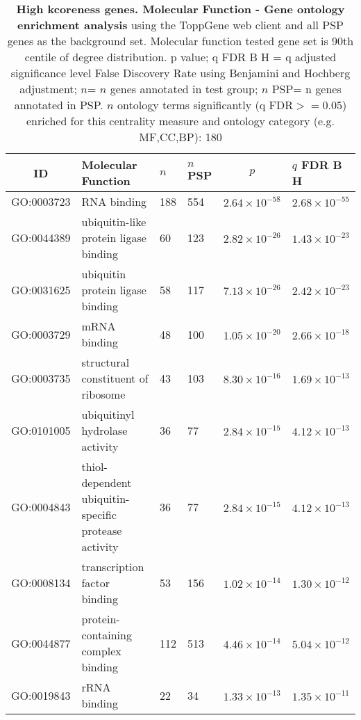   \begin{table}[ht]
\centering
\begin{adjustbox}{width=\textwidth}
\setlength{\extrarowheight}{2pt}
\begin{tabular}{@{}clllcl@{}}
  \toprule
  ID & Molecular Function & $n$ & $n$ PSP & $p$ & $q$ FDR B H \\ 

  \midrule
GO:0003723 & RNA binding & 188 & 554 & $2.64 \times 10^{-58}$ & $2.68 \times 10^{-55}$ \\ 
  GO:0044389 & ubiquitin-like protein ligase binding & 60 & 123 & $2.82 \times 10^{-26}$ & $1.43 \times 10^{-23}$ \\ 
  GO:0031625 & ubiquitin protein ligase binding & 58 & 117 & $7.13 \times 10^{-26}$ & $2.42 \times 10^{-23}$ \\ 
  GO:0003729 & mRNA binding & 48 & 100 & $1.05 \times 10^{-20}$ & $2.66 \times 10^{-18}$ \\ 
  GO:0003735 & structural constituent of ribosome & 43 & 103 & $8.30 \times 10^{-16}$ & $1.69 \times 10^{-13}$ \\ 
  GO:0101005 & ubiquitinyl hydrolase activity & 36 & 77 & $2.84 \times 10^{-15}$ & $4.12 \times 10^{-13}$ \\ 
  GO:0004843 & thiol-dependent ubiquitin-specific protease activity & 36 & 77 & $2.84 \times 10^{-15}$ & $4.12 \times 10^{-13}$ \\ 
  GO:0008134 & transcription factor binding & 53 & 156 & $1.02 \times 10^{-14}$ & $1.30 \times 10^{-12}$ \\ 
  GO:0044877 & protein-containing complex binding & 112 & 513 & $4.46 \times 10^{-14}$ & $5.04 \times 10^{-12}$ \\ 
  GO:0019843 & rRNA binding & 22 & 34 & $1.33 \times 10^{-13}$ & $1.35 \times 10^{-11}$ \\ 
   \bottomrule
\end{tabular}
\end{adjustbox}
\caption[Gene ontology enrichment High kcoreness genes Molecular Function of genes above 90th centile of distribution]{\textbf{High kcoreness genes. Molecular Function - Gene ontology enrichment analysis} using the ToppGene web client and all PSP genes as the background set.  Molecular function tested gene set is 90th centile of degree distribution.  p value; q FDR B H = q adjusted significance level False Discovery Rate using Benjamini and Hochberg adjustment; $n$= $n$ genes annotated in test group; $n$ PSP= n genes annotated in PSP. $n$ ontology terms significantly (q FDR$>=0.05$) enriched for this centrality measure and ontology category (e.g. MF,CC,BP): 180} 
\label{tab:ToppGENE GO: Molecular Function. kco 90 centile cwpsp.txtp = p value; q FDR B H = q adjusted significance level False Discovery Rate using Benjamini and Hochberg adjustment; n= n genes annotated in test group; n PSP= n genes annotated in PSP. n significant in category 180}
\end{table}


